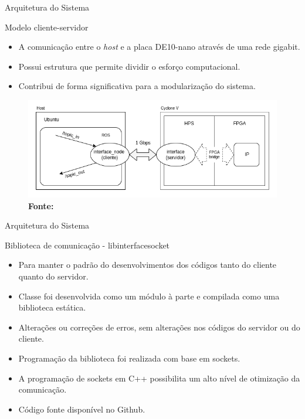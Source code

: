 \documentclass[10pt]{beamer}
\begin{document}
\begin{frame}{Arquitetura do Sistema}
    \begin{alertblock}{Modelo cliente-servidor}
		\vspace{0.2cm}
		\begin{itemize}
			\item A comunicação entre o \textit{host} e a placa DE10-nano através de uma rede gigabit.
			\item Possui estrutura que permite dividir o esforço computacional.
			\item Contribui de forma significativa para a modularização do sistema.
		\end{itemize}
		\begin{figure}[h]
			\begin{center}
				\includegraphics[scale=0.42]{imagens/arquitetura_geral.png}\\
				{\footnotesize \textbf{Fonte:}}
			\end{center}
			\label{fig:arquitetura}
		\end{figure}
	\end{alertblock}
\end{frame}


\begin{frame}{Arquitetura do Sistema}
	\begin{alertblock}{Biblioteca de comunicação - libinterfacesocket}
		\vspace{0.2cm}
	    \begin{itemize}
			\setlength\itemsep{0.7em}
	        \item Para manter o padrão do desenvolvimentos dos códigos tanto do cliente quanto do servidor.
	        \item Classe foi desenvolvida como um módulo à parte e compilada como uma biblioteca estática.
	        \item Alterações ou correções de erros, sem alterações nos códigos do servidor ou do cliente.
	        \item Programação da biblioteca foi realizada com base em sockets.
	        \item A programação de sockets em C++ possibilita um alto nível de otimização da comunicação.
	        \item Código fonte disponível no Github.
	    \end{itemize}
	\end{alertblock}
\end{frame}
\end{document}
